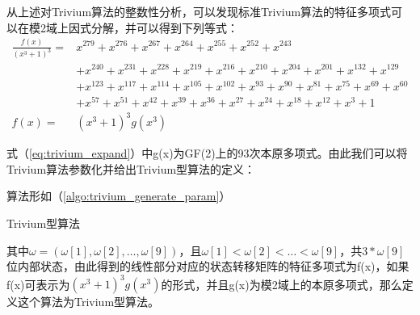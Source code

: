 从上述对Trivium算法的整数性分析，可以发现标准Trivium算法的特征多项式可以在模2域上因式分解，并可以得到下列等式：
\[\begin{split}
\frac{f(x)}{(x^3+1)^3}=&x^{279}+x^{276}+x^{267}+x^{264}+x^{255}+x^{252}+x^{243}\\
&+x^{240}+x^{231}+x^{228}+x^{219}+x^{216}+x^{210}+x^{204}+x^{201}+x^{132}+x^{129}\\
&+x^{123}+x^{117}+x^{114}+x^{105}+x^{102}+x^{93}+x^{90}+x^{81}+x^{75}+x^{69}+x^{60}\\
&+x^{57}+x^{51}+x^{42}+x^{39}+x^{36}+x^{27}+x^{24}+x^{18}+x^{12}+x^3+1\\
f(x)=&(x^3+1)^3g(x^3)
\end{split}\]
\begin{equation}
\label{eq:trivium_expand}
\end{equation}

式（\ref{eq:trivium_expand}）中g(x)为GF(2)上的93次本原多项式。由此我们可以将Trivium算法参数化并给出Trivium型算法的定义：
\begin{defn}[Trivium型算法的定义]
\label{defn:trivium}

算法形如（\ref{algo:trivium_generate_param}）

\begin{algorithm}[H]
\caption{Trivium型算法}
\label{algo:trivium_generate_param}
\begin{algorithmic}
    \ENDFOR
  \ENDFOR
\end{algorithmic}
\end{algorithm}

其中$\omega = (\omega[1], \omega[2], \ldots, \omega[9])$，且$\omega[1] < \omega[2] < \ldots < \omega[9]$，共$3*\omega[9]$位内部状态，由此得到的线性部分对应的状态转移矩阵的特征多项式为f(x)，如果f(x)可表示为$(x^{3}+1)^{3}g(x^{3})$的形式，并且g(x)为模2域上的本原多项式，那么定义这个算法为Trivium型算法。

\end{defn}

